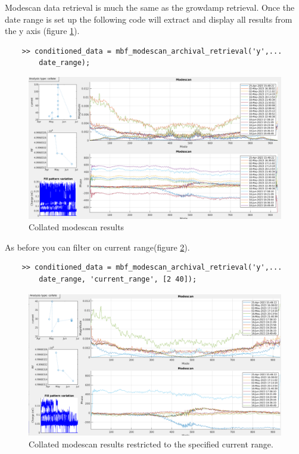 \documentclass{report}
\begin{document}
\clearpage
Modescan data retrieval is much the same as the growdamp retrieval. Once the date range is set up the following code will extract and display all results from the y axis (figure \ref{fig:modescan_collate}).  
\begin{verbatim}
    >> conditioned_data = mbf_modescan_archival_retrieval('y',...
        date_range); 
\end{verbatim}
 \begin{figure}[ht]
     \centering
     \includegraphics[width=1\linewidth]{modescan_collate.png}
     \caption{Collated modescan results}
     \label{fig:modescan_collate}
 \end{figure}

As before you can filter on current range(figure \ref{fig:modescan_collate_limited_range}).  
\begin{verbatim}
    >> conditioned_data = mbf_modescan_archival_retrieval('y',...
        date_range, 'current_range', [2 40]); 
\end{verbatim}
 \begin{figure}[ht]
     \centering
     \includegraphics[width=1\linewidth]{modescan_collate_limited_range.png}
     \caption{Collated modescan results restricted to the specified current range.}
     \label{fig:modescan_collate_limited_range}
 \end{figure}
\end{document}

